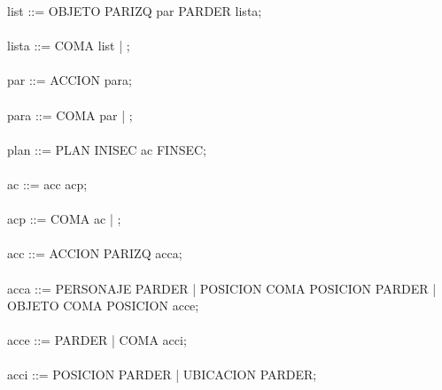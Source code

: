\documentclass[11pt,a4paper,spanish,twoside]{book}
\theoremstyle{plain} \newtheorem{nota}{Nota}
\begin{document}
list ::= OBJETO PARIZQ par PARDER lista;
\\
\\
lista ::= COMA list | ;
\\
\\
par ::= ACCION para;
\\
\\
para ::= COMA par | ;
\\
\\
plan ::= PLAN INISEC ac FINSEC;
\\
\\
ac ::= acc acp;
\\
\\
acp ::= COMA ac | ;
\\
\\
acc ::= ACCION PARIZQ acca;
\\
\\
acca ::= PERSONAJE PARDER | POSICION COMA POSICION PARDER | OBJETO COMA POSICION acce;
\\
\\
acce ::= PARDER | COMA acci;
\\
\\
acci ::= POSICION PARDER | UBICACION PARDER;
\end{document}
